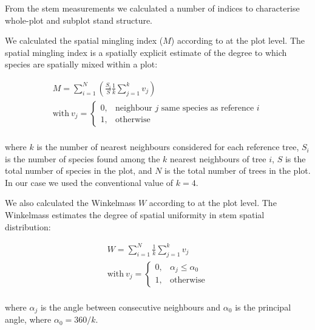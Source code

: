 \documentclass[11pt,a4paper]{article}
\begin{document}
From the stem measurements we calculated a number of indices to characterise whole-plot and subplot stand structure.

We calculated the spatial mingling index ($M$) according to \citet{Gadow2002} at the plot level. The spatial mingling index is a spatially explicit estimate of the degree to which species are spatially mixed within a plot:

\begin{gather}
	M = \sum_{i=1}^{N} (\frac{S_{i}}{S} \frac{1}{k} \sum_{j=1}^{k} v_{j})	\\
	\text{with}\ v_{j} = \begin{cases}
		0,& \text{neighbour $j$ same species as reference $i$} \\
		1,& \text{otherwise}
	\end{cases} \\
\end{gather}

where $k$ is the number of nearest neighbours considered for each reference tree, $S_{i}$ is the number of species found among the $k$ nearest neighbours of tree $i$, $S$ is the total number of species in the plot, and $N$ is the total number of trees in the plot. In our case we used the conventional value of $k = 4$.

We also calculated the Winkelmass $W$ according to \citet{Gadow2002} at the plot level. The Winkelmass estimates the degree of spatial uniformity in stem spatial distribution:

\begin{gather}
	W = \sum_{i=1}^{N} \frac{1}{k} \sum_{j=1}^{k} v_{j} \\
	\text{with}\ v_{j} = \begin{cases}
		0,& \alpha_{j} \le \alpha_{0} \\
		1,& \text{otherwise}
	\end{cases} \\
\end{gather}

where $\alpha_{j}$ is the angle between consecutive neighbours and $\alpha_{0}$ is the principal angle, where $\alpha_{0} = 360 / k$.
\end{document}
